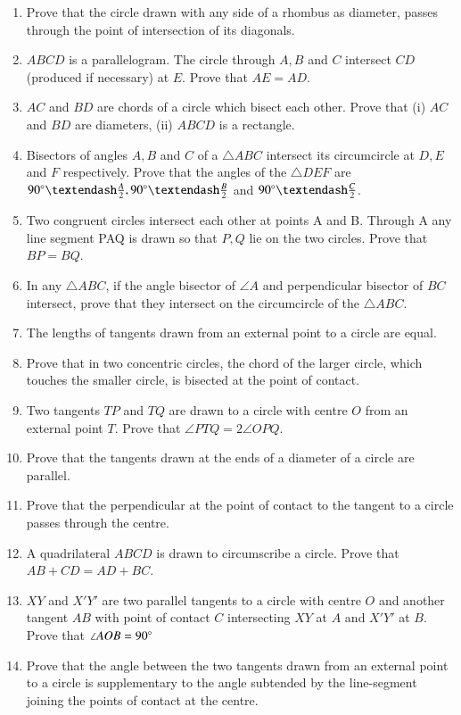 \begin{enumerate}[label=\arabic*.,ref=\thesubsection.\theenumi]
\item Prove that the circle drawn with any side of a rhombus as diameter, passes through
the point of intersection of its diagonals.
\item $ABCD$ is a parallelogram. The circle through $A, B$ and $C$ intersect $CD$ (produced if
necessary) at $E$. Prove that $AE = AD$.
\item $AC$ and $BD$ are chords of a circle which bisect each other. Prove that (i) $AC$ and $BD$ are
diameters, (ii) $ABCD$ is a rectangle.
\item Bisectors of angles $A, B$ and $C$ of a $\triangle ABC$ intersect its circumcircle at $D, E$ and
$F$ respectively. Prove that the angles of the $\triangle DEF$ are $90\degree – \frac{A}{2}, 90\degree – \frac{B}{2}$ and $90\degree – \frac{C}{2}$.
\item Two congruent circles intersect each other at points A and B. Through A any line segment PAQ is drawn so that $P, Q$ lie on the two circles. Prove that $BP = BQ$.
\item In any $\triangle ABC$, if the angle bisector of $\angle A$ and perpendicular bisector of $BC$ intersect, prove that they intersect on the circumcircle of the $\triangle ABC$.
%
\item The lengths of tangents drawn from an external point to a circle are equal.
%
\item Prove that in two concentric circles, the chord of the larger circle, which touches the smaller circle, is bisected at the point of contact.
%
\item Two tangents $TP$ and $TQ$ are drawn to a circle with centre $O$ from an external point $T$. Prove that $\angle PTQ = 2 \angle OPQ$.
%
\item Prove that the tangents drawn at the ends of a diameter of a circle are parallel. 
\item  Prove that the perpendicular at the point of contact to the tangent to a circle passes through the centre.
\item A quadrilateral $ABCD$ is drawn to circumscribe a circle. Prove that 
$AB + CD = AD + BC$.
%
\item $XY$ and $X'Y'$ are two parallel tangents to a circle with centre $O$ and another tangent $AB$ with point of contact $C$ intersecting $XY$ at $A$ and $X'Y'$ at $B$. Prove that $\angle AOB = 90\degree$
\item Prove that the angle between the two tangents drawn from an external point to a circle is supplementary to the angle subtended by the line-segment joining the points of contact at the centre.

\end{enumerate}
